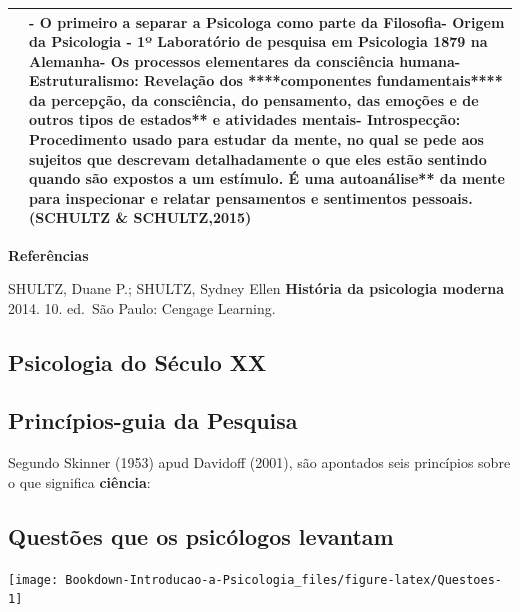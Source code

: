 \documentclass[
]{book}
\begin{document}
\begin{longtable}[]{@{}
  >{\centering\arraybackslash}p{}
  >{\raggedright\arraybackslash}p{}@{}}
\toprule()
\endhead
& - \textbf{O primeiro a separar a Psicologa} como parte da Filosofia- Origem da Psicologia - 1º Laboratório de pesquisa em Psicologia 1879 na Alemanha- Os processos elementares da consciência humana- \textbf{Estruturalismo}: Revelação dos ****componentes fundamentais**** da \textbf{percepção}, da \textbf{consciência}, do \textbf{pensamento}, das \textbf{emoções} e de \textbf{outros tipos de }estados** e \textbf{atividades} mentais\textbf{- }Introspecção\textbf{: Procedimento usado para estudar da mente, no qual se pede aos sujeitos que descrevam detalhadamente o que eles estão sentindo quando são expostos a um estímulo. É uma }autoanálise** da mente para \textbf{inspecionar} e \textbf{relatar} \textbf{pensamentos} e \textbf{sentimentos} pessoais. (SCHULTZ \& SCHULTZ,2015) \\
\bottomrule()
\end{longtable}

\textbf{Referências}

SHULTZ, Duane P.; SHULTZ, Sydney Ellen \textbf{História da psicologia moderna} 2014. 10. ed.~São Paulo: Cengage Learning.

\hypertarget{psicologia-do-suxe9culo-xx}{%
\subsection{Psicologia do Século XX}\label{psicologia-do-suxe9culo-xx}}

\hypertarget{princuxedpios-guia-da-pesquisa}{%
\subsection{Princípios-guia da Pesquisa}\label{princuxedpios-guia-da-pesquisa}}

Segundo Skinner (1953) apud Davidoff (2001), são apontados seis princípios sobre o que significa \textbf{ciência}:

\hypertarget{questuxf5es-que-os-psicuxf3logos-levantam}{%
\subsection{Questões que os psicólogos levantam}\label{questuxf5es-que-os-psicuxf3logos-levantam}}

\texttt{[image: Bookdown-Introducao-a-Psicologia\_files/figure-latex/Questoes-1]}
\end{document}
